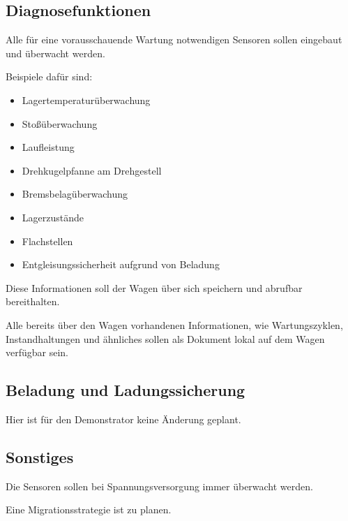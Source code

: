 \subsection{Diagnosefunktionen}
\begin{feat}
Alle für eine vorausschauende Wartung notwendigen Sensoren sollen eingebaut und überwacht werden.
\end{feat}
\begin{rem} [zu Anf. 40]
Beispiele dafür sind:
\begin{itemize}
    \item Lagertemperaturüberwachung
    \item Stoßüberwachung
    \item Laufleistung
    \item Drehkugelpfanne am Drehgestell
    \item Bremsbelagüberwachung
    \item Lagerzustände
    \item Flachstellen
    \item Entgleisungssicherheit aufgrund von Beladung
\end{itemize}
\end{rem}
\begin{feat}
Diese Informationen soll der Wagen über sich speichern und abrufbar bereithalten.
\end{feat}
\begin{feat}
Alle bereits über den Wagen vorhandenen Informationen, wie Wartungszyklen, Instandhaltungen und ähnliches sollen als Dokument lokal auf dem Wagen  verfügbar sein.
\end{feat}

\subsection{Beladung und Ladungssicherung}
Hier ist für den Demonstrator keine Änderung geplant.

\subsection{Sonstiges}
\begin{feat}
Die Sensoren sollen bei Spannungsversorgung immer überwacht werden.
\end{feat}
\begin{feat}
Eine Migrationsstrategie ist zu planen.
\end{feat}